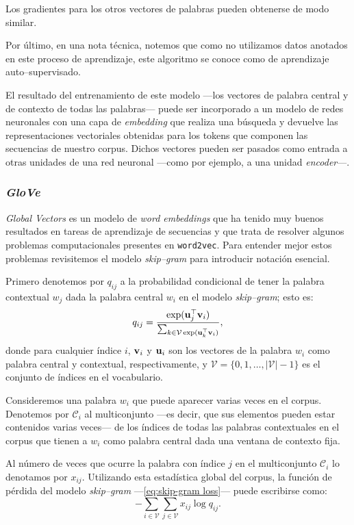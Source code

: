 \documentclass[12pt]{article}
\newcommand{\code}{\texttt}
\newcommand{\ce}{\bm{\textbf v}}
\newcommand{\co}{\bm{\textbf u}}
\begin{document}
Los gradientes para los otros vectores de palabras pueden obtenerse de modo similar.

Por último, en una nota técnica, notemos que como no utilizamos datos anotados en este proceso de aprendizaje, este algoritmo se conoce como de aprendizaje auto--supervisado.

El resultado del entrenamiento de este modelo ---los vectores de palabra central y de contexto de todas las palabras--- puede ser incorporado a un modelo de redes neuronales con una capa de \textit{embedding} que realiza una búsqueda y devuelve las representaciones vectoriales obtenidas para los tokens que componen las secuencias de nuestro corpus. Dichos vectores pueden ser pasados como entrada a otras unidades de una red neuronal ---como por ejemplo, a una unidad \textit{encoder}---.

\subsubsection{\textit{GloVe}}

\textit{Global Vectors} \parencite{Pennington2014} es un modelo de \textit{word embeddings} que ha tenido muy buenos resultados en tareas de aprendizaje de secuencias y que trata de resolver algunos problemas computacionales presentes en \code{word2vec}. Para entender mejor estos problemas revisitemos el modelo \textit{skip--gram} para introducir notación esencial.

Primero denotemos por $ q_{ij} $ a la probabilidad condicional de tener la palabra contextual $ w_j $ dada la palabra central $ w_i $ en el modelo \textit{skip--gram}; esto es:
\begin{equation}
    q_{ij} = \frac{\exp(\co_j^{\top}\ce_i)}{\sum_{k \in \mathcal{V} \exp(\co_{k}^{\top}\ce_i)}},
\end{equation}
donde para cualquier índice $ i $, $ \ce_i $ y $ \co_i $ son los vectores de la palabra $ w_i $ como palabra central y contextual, respectivamente, y $ \mathcal{V} = \{0, 1, \ldots, |\mathcal{V}| - 1\} $ es el conjunto de índices en el vocabulario.

Consideremos una palabra $ w_i $ que puede aparecer varias veces en el corpus. Denotemos por $ \mathcal{C}_i $ al multiconjunto ---es decir, que sus elementos pueden estar contenidos varias veces--- de los índices de todas las palabras contextuales en el corpus que tienen a $ w_i $ como palabra central dada una ventana de contexto fija. 

Al número de veces que ocurre la palabra con índice $ j $ en el multiconjunto $ \mathcal{C}_i $ lo denotamos por $ x_{ij} $. Utilizando esta estadística global del corpus, la función de pérdida del modelo \textit{skip--gram} ---\cref{eq:skip-gram loss}--- puede escribirse como:
\begin{equation}
    -\sum_{i \in \mathcal{V}}\sum_{j \in \mathcal{V}} x_{ij} \log q_{ij}. \label{eq:skip-gram again}
\end{equation}
\end{document}
